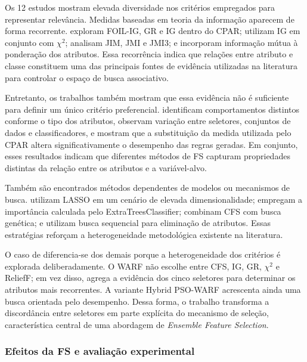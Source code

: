 Os 12 estudos mostram elevada diversidade nos critérios empregados para
representar relevância. Medidas baseadas em teoria da informação aparecem de
forma recorrente.  exploram FOIL-IG, GR e
IG dentro do CPAR;  utilizam IG em
conjunto com $\chi^2$;  analisam JIM, JMI e
JMI3; e  incorporam informação mútua à ponderação dos
atributos. Essa recorrência indica que relações entre atributo e classe
constituem uma das principais fontes de evidência utilizadas na literatura para
controlar o espaço de busca associativo.

Entretanto, os trabalhos também mostram que essa evidência não é suficiente para
definir um único critério preferencial. 
identificam comportamentos distintos conforme o tipo dos atributos,
 observam variação entre seletores, conjuntos de
dados e classificadores, e  mostram que a
substituição da medida utilizada pelo CPAR altera significativamente o
desempenho das regras geradas. Em conjunto, esses resultados indicam que
diferentes métodos de FS capturam propriedades distintas da relação entre os
atributos e a variável-alvo.

Também são encontrados métodos dependentes de modelos ou mecanismos de busca.
 utilizam LASSO em um cenário de elevada
dimensionalidade;  empregam a importância
calculada pelo ExtraTreesClassifier; 
combinam CFS com busca genética; e  utilizam
busca sequencial para eliminação de atributos. Essas estratégias reforçam a
heterogeneidade metodológica existente na literatura.

O caso de  diferencia-se dos demais porque a
heterogeneidade dos critérios é explorada deliberadamente. O WARF não escolhe
entre CFS, IG, GR, $\chi^2$ e ReliefF; em vez disso, agrega a evidência dos
cinco seletores para determinar os atributos mais recorrentes. A variante
Hybrid PSO-WARF acrescenta ainda uma busca orientada pelo desempenho. Dessa
forma, o trabalho transforma a discordância entre seletores em parte explícita
do mecanismo de seleção, característica central de uma abordagem de
\textit{Ensemble Feature Selection}.

\subsubsection{Efeitos da FS e avaliação experimental}

